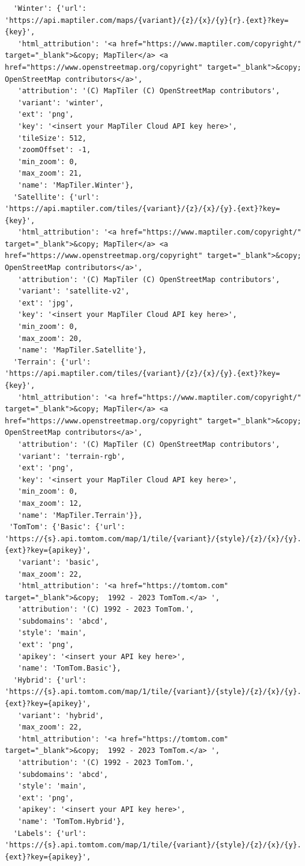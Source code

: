 \documentclass[
  letterpaper,
  DIV=11,
  numbers=noendperiod]{scrreprt}
\begin{document}
\begin{verbatim}
  'Winter': {'url': 'https://api.maptiler.com/maps/{variant}/{z}/{x}/{y}{r}.{ext}?key={key}',
   'html_attribution': '<a href="https://www.maptiler.com/copyright/" target="_blank">&copy; MapTiler</a> <a href="https://www.openstreetmap.org/copyright" target="_blank">&copy; OpenStreetMap contributors</a>',
   'attribution': '(C) MapTiler (C) OpenStreetMap contributors',
   'variant': 'winter',
   'ext': 'png',
   'key': '<insert your MapTiler Cloud API key here>',
   'tileSize': 512,
   'zoomOffset': -1,
   'min_zoom': 0,
   'max_zoom': 21,
   'name': 'MapTiler.Winter'},
  'Satellite': {'url': 'https://api.maptiler.com/tiles/{variant}/{z}/{x}/{y}.{ext}?key={key}',
   'html_attribution': '<a href="https://www.maptiler.com/copyright/" target="_blank">&copy; MapTiler</a> <a href="https://www.openstreetmap.org/copyright" target="_blank">&copy; OpenStreetMap contributors</a>',
   'attribution': '(C) MapTiler (C) OpenStreetMap contributors',
   'variant': 'satellite-v2',
   'ext': 'jpg',
   'key': '<insert your MapTiler Cloud API key here>',
   'min_zoom': 0,
   'max_zoom': 20,
   'name': 'MapTiler.Satellite'},
  'Terrain': {'url': 'https://api.maptiler.com/tiles/{variant}/{z}/{x}/{y}.{ext}?key={key}',
   'html_attribution': '<a href="https://www.maptiler.com/copyright/" target="_blank">&copy; MapTiler</a> <a href="https://www.openstreetmap.org/copyright" target="_blank">&copy; OpenStreetMap contributors</a>',
   'attribution': '(C) MapTiler (C) OpenStreetMap contributors',
   'variant': 'terrain-rgb',
   'ext': 'png',
   'key': '<insert your MapTiler Cloud API key here>',
   'min_zoom': 0,
   'max_zoom': 12,
   'name': 'MapTiler.Terrain'}},
 'TomTom': {'Basic': {'url': 'https://{s}.api.tomtom.com/map/1/tile/{variant}/{style}/{z}/{x}/{y}.{ext}?key={apikey}',
   'variant': 'basic',
   'max_zoom': 22,
   'html_attribution': '<a href="https://tomtom.com" target="_blank">&copy;  1992 - 2023 TomTom.</a> ',
   'attribution': '(C) 1992 - 2023 TomTom.',
   'subdomains': 'abcd',
   'style': 'main',
   'ext': 'png',
   'apikey': '<insert your API key here>',
   'name': 'TomTom.Basic'},
  'Hybrid': {'url': 'https://{s}.api.tomtom.com/map/1/tile/{variant}/{style}/{z}/{x}/{y}.{ext}?key={apikey}',
   'variant': 'hybrid',
   'max_zoom': 22,
   'html_attribution': '<a href="https://tomtom.com" target="_blank">&copy;  1992 - 2023 TomTom.</a> ',
   'attribution': '(C) 1992 - 2023 TomTom.',
   'subdomains': 'abcd',
   'style': 'main',
   'ext': 'png',
   'apikey': '<insert your API key here>',
   'name': 'TomTom.Hybrid'},
  'Labels': {'url': 'https://{s}.api.tomtom.com/map/1/tile/{variant}/{style}/{z}/{x}/{y}.{ext}?key={apikey}',

\end{verbatim}
\end{document}

